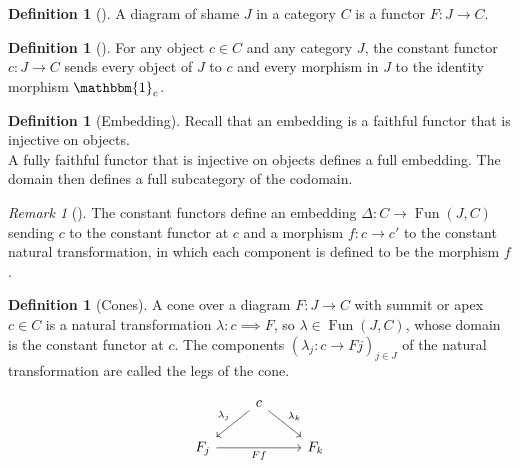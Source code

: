 \documentclass[reqno]{amsart}
\theoremstyle{definition}
\newtheorem{definition}[theorem]{Definition}
\theoremstyle{remark}
\newtheorem*{remark}{Remark}
\DeclareMathOperator{\Fun}{Fun}
\begin{document}
    \begin{definition}[]
        A diagram of shame $J$ in a category $C$ is 
        a functor $F \colon J \to C$.
    \end{definition}

    \begin{definition}[]
        For any object $c \in C$ and any category
        $J$, the constant functor $c \colon J \to C$ 
        sends every object of $J$ to $c$ and every
        morphism in $J$ to the identity morphism
        $\mathbbm{1}_c$.
    \end{definition}

    \begin{definition}[Embedding]
        Recall that an embedding is a faithful functor that
        is injective on objects.\\
        A fully faithful functor that is injective on
        objects defines a full embedding. The domain
        then defines a full subcategory of the codomain.
    \end{definition}



    \begin{remark}[]
        The constant functors define an embedding
        $\Delta \colon C \to \Fun (J,C)$
        sending $c$ to the constant functor at
        $c$ and a morphism $f \colon c \to c'$ to
        the constant natural transformation, in
        which each component is defined to be the morphism
        $f$.
    \end{remark}

    \begin{definition}[Cones]
        A cone over a diagram $F \colon J \to C$ with
        summit or apex $c \in C$ is a natural
        transformation $\lambda \colon c \implies F$, so
        $\lambda \in \Fun (J,C)$, whose
        domain is the constant functor at $c$.
        The components
        $\left( \lambda_j \colon c \to Fj \right)_{j \in J}$ 
        of the natural transformation are
        called the legs of the cone.

        \begin{equation*}
        \begin{tikzcd}
            & c \ar[ld, "\lambda_j"'] \ar[dr, "\lambda_k"]&\\
            F_j \ar[rr, "Ff"'] & & F_k
        \end{tikzcd}
        \end{equation*}

    \end{definition}
\end{document}
